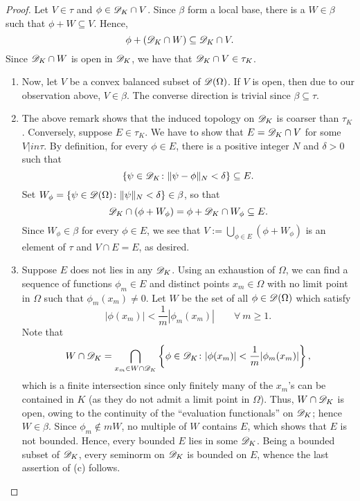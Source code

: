 \begin{proof}
Let $V\in\tau$ and $\phi\in\mathscr{D}_K\cap V$. Since $\beta$ form a local base, there is a $W\in\beta$ such that $\phi + W\subseteq V$. Hence, 
\begin{equation*}
    \phi + (\mathscr{D}_K\cap W)\subseteq\mathscr{D}_K\cap V.
\end{equation*}
Since $\mathscr{D}_K\cap W$ is open in $\mathscr{D}_K$, we have that $\mathscr{D}_K\cap V\in\tau_K$.
\begin{enumerate}[label=(\alph*)]
\item Now, let $V$ be a convex balanced subset of $\mathscr{D}(\Omega)$. If $V$ is open, then due to our observation above, $V\in\beta$. The converse direction is trivial since $\beta\subseteq\tau$.

\item The above remark shows that the induced topology on $\mathscr{D}_K$ is coarser than $\tau_K$. Conversely, suppose $E\in\tau_K$. We have to show that $E = \mathscr{D}_K\cap V$ for some $V|in\tau$. By definition, for every $\phi\in E$, there is a positive integer $N$ and $\delta > 0$ such that 
\begin{equation*}
    \{\psi\in\mathscr{D}_K\colon\|\psi - \phi\|_N < \delta\}\subseteq E.
\end{equation*}
Set $W_\phi = \{\psi\in\mathscr{D}(\Omega)\colon \|\psi\|_N < \delta\}\in\beta$, so that
\begin{equation*}
    \mathscr{D}_K\cap(\phi + W_\phi) = \phi + \mathscr{D}_K\cap W_\phi\subseteq E.
\end{equation*}
Since $W_\phi\in\beta$ for every $\phi\in E$, we see that $V := \bigcup\limits_{\phi\in E} (\phi + W_\phi)$ is an element of $\tau$ and $V\cap E = E$, as desired. 

\item Suppose $E$ does not lies in any $\mathscr{D}_K$. Using an exhaustion of $\Omega$, we can find a sequence of functions $\phi_m\in E$ and distinct points $x_m\in\Omega$ with no limit point in $\Omega$ such that $\phi_m(x_m)\ne 0$. Let $W$ be the set of all $\phi\in\mathscr{D}(\Omega)$ which satisfy 
\begin{equation*}
    |\phi(x_m)| < \frac{1}{m}|\phi_m(x_m)| \qquad\forall~m\ge 1.
\end{equation*}
Note that 
\begin{equation*}
    W\cap\mathscr{D}_K = \bigcap_{x_m\in W\cap\mathscr{D}_K}\left\{\phi\in\mathscr{D}_K\colon|\phi(x_m)| < \frac{1}{m}|\phi_m(x_m)|\right\},
\end{equation*}
which is a finite intersection since only finitely many of the $x_m$'s can be contained in $K$ (as they do not admit a limit point in $\Omega$). Thus, $W\cap\mathscr{D}_K$ is open, owing to the continuity of the ``evaluation functionals'' on $\mathscr{D}_K$; hence $W\in\beta$. Since $\phi_m\notin mW$, no multiple of $W$ contains $E$, which shows that $E$ is not bounded. Hence, every bounded $E$ lies in some $\mathscr{D}_K$. Being a bounded subset of $\mathscr{D}_K$, every seminorm on $\mathscr{D}_K$ is bounded on $E$, whence the last assertion of (c) follows.


\end{enumerate}
\end{proof}

